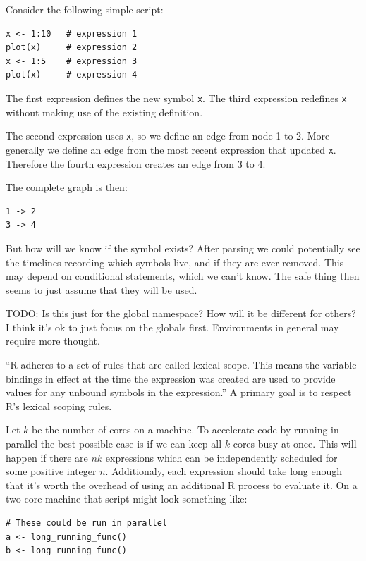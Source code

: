 \documentclass[12pt]{article}
\begin{document}
Consider the following simple script:

\begin{verbatim}
x <- 1:10   # expression 1
plot(x)     # expression 2
x <- 1:5    # expression 3
plot(x)     # expression 4
\end{verbatim}

The first expression defines the new symbol \texttt{x}. The third
expression redefines \texttt{x} without making use of the existing
definition.

The second expression uses \texttt{x}, so we define an edge from node 1 to 2.
More generally we define an edge from the most recent expression that
updated \texttt{x}. Therefore the fourth expression creates an edge from 3
to 4.

The complete graph is then:

\begin{verbatim}
1 -> 2
3 -> 4
\end{verbatim}

But how will we know if the symbol exists? After parsing we could
potentially see the timelines recording which symbols live, and if they are
ever removed. This may depend on conditional statements, which we can't
know. The safe thing then seems to just assume that they will be used.

TODO: Is this just for the global namespace? How will it be different for
others? I think it's ok to just focus on the globals first. Environments in
general may require more thought.

``R adheres to a set of rules that are called lexical scope. This means the
variable bindings in effect at the time the expression was created are used
to provide values for any unbound symbols in the expression.''
\cite{Rlang} A primary goal is to respect R's lexical scoping rules.

Let $k$ be the number of cores on a machine.
To accelerate code by running in parallel the best possible case is if
we can keep all $k$ cores busy at once. This will happen if there are $nk$
expressions which can be independently scheduled for some positive integer
$n$. Additionaly, each expression should take long enough that
it's worth the overhead of using an additional R process to evaluate it.
On a two core machine that script might look something like:

\begin{verbatim}
# These could be run in parallel
a <- long_running_func()
b <- long_running_func()
\end{verbatim}
\end{document}
